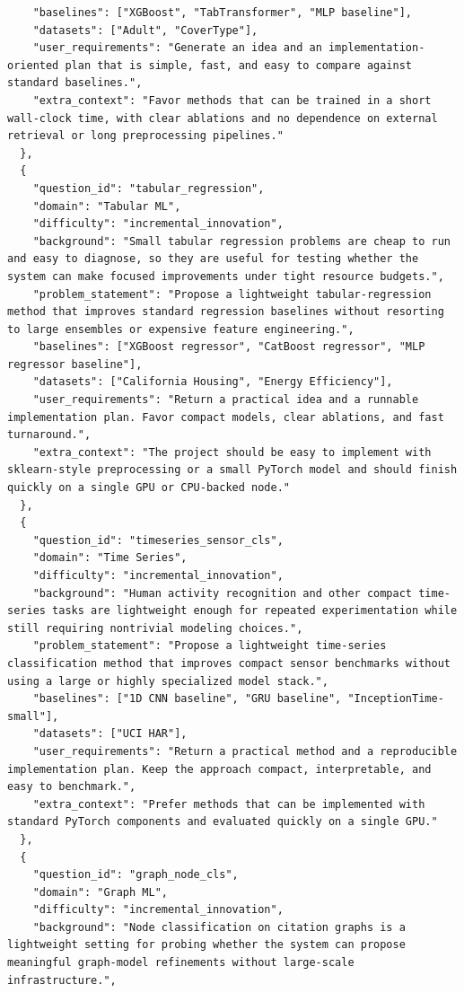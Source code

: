 \documentclass{opendatalab}
\begin{document}
\begin{lstlisting}
    "baselines": ["XGBoost", "TabTransformer", "MLP baseline"],
    "datasets": ["Adult", "CoverType"],
    "user_requirements": "Generate an idea and an implementation-oriented plan that is simple, fast, and easy to compare against standard baselines.",
    "extra_context": "Favor methods that can be trained in a short wall-clock time, with clear ablations and no dependence on external retrieval or long preprocessing pipelines."
  },
  {
    "question_id": "tabular_regression",
    "domain": "Tabular ML",
    "difficulty": "incremental_innovation",
    "background": "Small tabular regression problems are cheap to run and easy to diagnose, so they are useful for testing whether the system can make focused improvements under tight resource budgets.",
    "problem_statement": "Propose a lightweight tabular-regression method that improves standard regression baselines without resorting to large ensembles or expensive feature engineering.",
    "baselines": ["XGBoost regressor", "CatBoost regressor", "MLP regressor baseline"],
    "datasets": ["California Housing", "Energy Efficiency"],
    "user_requirements": "Return a practical idea and a runnable implementation plan. Favor compact models, clear ablations, and fast turnaround.",
    "extra_context": "The project should be easy to implement with sklearn-style preprocessing or a small PyTorch model and should finish quickly on a single GPU or CPU-backed node."
  },
  {
    "question_id": "timeseries_sensor_cls",
    "domain": "Time Series",
    "difficulty": "incremental_innovation",
    "background": "Human activity recognition and other compact time-series tasks are lightweight enough for repeated experimentation while still requiring nontrivial modeling choices.",
    "problem_statement": "Propose a lightweight time-series classification method that improves compact sensor benchmarks without using a large or highly specialized model stack.",
    "baselines": ["1D CNN baseline", "GRU baseline", "InceptionTime-small"],
    "datasets": ["UCI HAR"],
    "user_requirements": "Return a practical method and a reproducible implementation plan. Keep the approach compact, interpretable, and easy to benchmark.",
    "extra_context": "Prefer methods that can be implemented with standard PyTorch components and evaluated quickly on a single GPU."
  },
  {
    "question_id": "graph_node_cls",
    "domain": "Graph ML",
    "difficulty": "incremental_innovation",
    "background": "Node classification on citation graphs is a lightweight setting for probing whether the system can propose meaningful graph-model refinements without large-scale infrastructure.",

\end{lstlisting}
\end{document}
